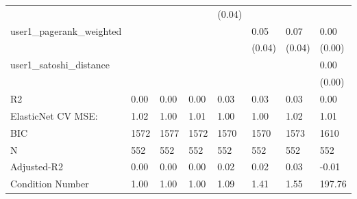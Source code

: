 \begin{table}
\begin{center}
\begin{tabular}{llllllll}
                                               &          &            &         & (0.04)  &          &             &         \\
user1_pagerank_weighted                        &          &            &         &         & 0.05     & 0.07        & 0.00    \\
                                               &          &            &         &         & (0.04)   & (0.04)      & (0.00)  \\
user1_satoshi_distance                         &          &            &         &         &          &             & 0.00    \\
                                               &          &            &         &         &          &             & (0.00)  \\
R2                                             & 0.00     & 0.00       & 0.00    & 0.03    & 0.03     & 0.03        & 0.00    \\
ElasticNet CV MSE:                             & 1.02     & 1.00       & 1.01    & 1.00    & 1.00     & 1.02        & 1.01    \\
BIC                                            & 1572     & 1577       & 1572    & 1570    & 1570     & 1573        & 1610    \\
N                                              & 552      & 552        & 552     & 552     & 552      & 552         & 552     \\
Adjusted-R2                                    & 0.00     & 0.00       & 0.00    & 0.02    & 0.02     & 0.03        & -0.01   \\
Condition Number                               & 1.00     & 1.00       & 1.00    & 1.09    & 1.41     & 1.55        & 197.76  \\
\hline
\end{tabular}
\end{center}
\end{table}